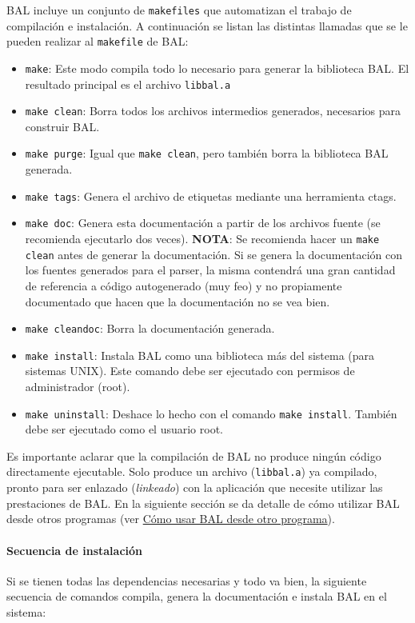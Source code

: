 BAL incluye un conjunto de {\tt makefiles} que automatizan el trabajo de compilación e instalación. A continuación se listan las distintas llamadas que se le pueden realizar al {\tt makefile} de BAL: \begin{itemize}
\item {\tt make}: Este modo compila todo lo necesario para generar la biblioteca BAL. El resultado principal es el archivo {\tt libbal.a} \item {\tt make clean}: Borra todos los archivos intermedios generados, necesarios para construir BAL. \item {\tt make purge}: Igual que {\tt make clean}, pero también borra la biblioteca BAL generada. \item {\tt make tags}: Genera el archivo de etiquetas mediante una herramienta ctags. \item {\tt make doc}: Genera esta documentación a partir de los archivos fuente (se recomienda ejecutarlo dos veces). {\bf NOTA}: Se recomienda hacer un {\tt make clean} antes de generar la documentación. Si se genera la documentación con los fuentes generados para el parser, la misma contendrá una gran cantidad de referencia a código autogenerado (muy feo) y no propiamente documentado que hacen que la documentación no se vea bien. \item {\tt make cleandoc}: Borra la documentación generada. \item {\tt make install}: Instala BAL como una biblioteca más del sistema (para sistemas UNIX). Este comando debe ser ejecutado con permisos de administrador (root). \item {\tt make uninstall}: Deshace lo hecho con el comando {\tt make install}. También debe ser ejecutado como el usuario root. \end{itemize}


Es importante aclarar que la compilación de BAL no produce ningún código directamente ejecutable. Solo produce un archivo ({\tt libbal.a}) ya compilado, pronto para ser enlazado ({\em linkeado\/}) con la aplicación que necesite utilizar las prestaciones de BAL. En la siguiente sección se da detalle de cómo utilizar BAL desde otros programas (ver \hyperlink{index_usesec}{Cómo usar BAL desde otro programa}).\hypertarget{index_installsec}{}\paragraph{Secuencia de instalación}\label{index_installsec}
Si se tienen todas las dependencias necesarias y todo va bien, la siguiente secuencia de comandos compila, genera la documentación e instala BAL en el sistema:

